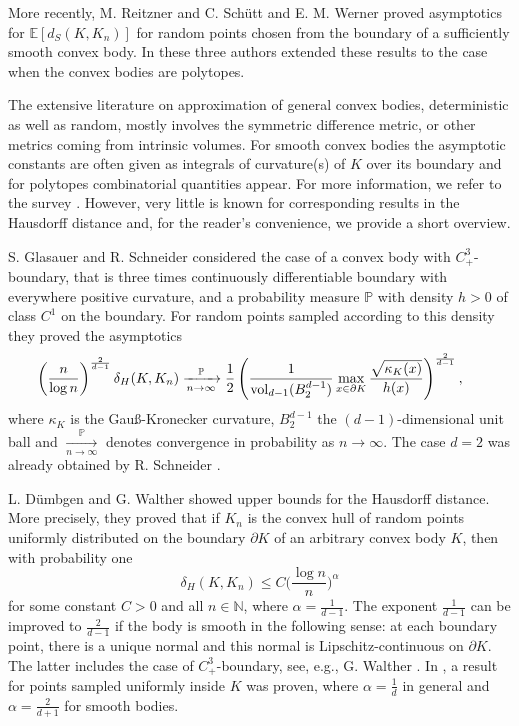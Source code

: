 \documentclass[a4paper,12pt]{article}
\theoremstyle{definition}
\newcommand{\IE}{\mathbb{E}}
\begin{document}
More recently, M. Reitzner \cite{Rei02} and C. Sch\"utt and E. M. Werner \cite{SW03} proved asymptotics for $\IE[ d_S(K,K_n)]$ for random points chosen from the boundary of a sufficiently smooth convex body. In \cite{RSW23} these three authors extended these results to the case when the convex bodies are polytopes. 

The extensive literature on approximation of general convex bodies, deterministic as well as random,  mostly involves  the symmetric difference metric, or other metrics coming from intrinsic volumes. For smooth convex bodies the asymptotic constants are often given as integrals of curvature(s) of $K$ over its boundary and for polytopes combinatorial quantities appear. For more information, we refer to the survey \cite{PSW22}. 
However, very little is known for corresponding results in the Hausdorff distance and, for the reader's convenience, we provide a short overview.

S. Glasauer and R. Schneider \cite{GS96} considered the case of a convex body with $C^{3}_{+}$-boundary, that is three times continuously  differentiable boundary with everywhere positive curvature, and a probability measure $\mathbb P$ with  density $h>0$ of class $C^{1}$ on the boundary. For random points sampled according to this density they proved the asymptotics
\begin{equation}
	\label{eq:gs-smooth}
\hskip -5mm
\left(\frac{n}{\log n}\right)^{\frac{2}{d-1}}\delta_{H}(K,K_{n})
\xrightarrow[n\to\infty]{\mathbb{P}}
\frac{1}{2}\left(
\frac{1}{\operatorname{vol}_{d-1}(B_{2}^{d-1})}\max_{x\in\partial K}\frac{\sqrt{\kappa_{K}(x)}}{h(x)}
\right)^{\frac{2}{d-1}},
\end{equation}
where $\kappa_K$ is the Gau\ss-Kronecker curvature, $B_2^{d-1}$ the $(d-1)$-dimensional unit ball and $ \xrightarrow[n\to\infty]{\mathbb{P}}$ denotes convergence in probability as $n\to\infty$. The case $d=2$ was already obtained by R. Schneider \cite{Sch88}.

L. D\"umbgen and G. Walther \cite{DW96} showed upper bounds for the Hausdorff distance. More precisely, they proved that if $K_n$ is the convex hull of random points uniformly distributed on the boundary $\partial K$ of an arbitrary convex body $K$, then with probability one
 \[
\delta_{H}(K,K_{n})
\le C \Big(\frac{\log n}{n}\Big)^{\alpha}
 \]
 for some constant $C>0$ and all $n\in\mathbb N$, where $\alpha=\frac{1}{d-1}$.  The exponent $\frac{1}{d-1}$ can be improved to $\frac{2}{d-1}$ if the body is smooth in the following sense: at each boundary point, there is a unique normal and this normal is Lipschitz-continuous  on $\partial K$. The latter includes the case of $C^3_+$-boundary, see, e.g., G. Walther \cite[Thm. 1]{Wal99}. In \cite{DW96},  a result for points sampled uniformly inside $K$ was proven, where $\alpha=\frac{1}{d}$ in general and $\alpha=\frac{2}{d+1}$ for smooth bodies. 
\end{document}
